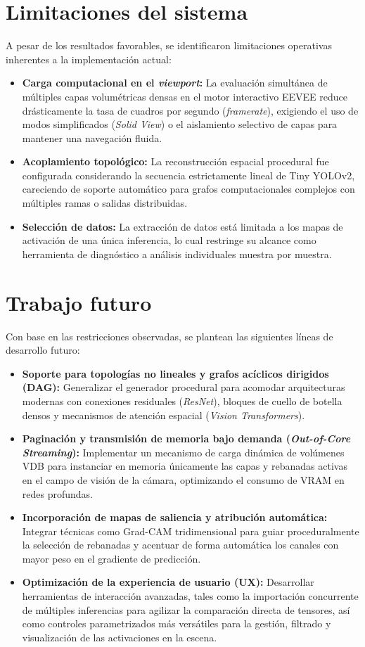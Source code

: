 \section{Limitaciones del sistema}
A pesar de los resultados favorables, se identificaron limitaciones operativas inherentes a la implementación actual:
\begin{itemize}
    \item \textbf{Carga computacional en el \textit{viewport}:} La evaluación simultánea de múltiples capas volumétricas densas en el motor 
    interactivo EEVEE reduce drásticamente la tasa de cuadros por segundo (\textit{framerate}), exigiendo el uso de modos simplificados 
    (\textit{Solid View}) o el aislamiento selectivo de capas para mantener una navegación fluida.
    \item \textbf{Acoplamiento topológico:} La reconstrucción espacial procedural fue configurada considerando la secuencia estrictamente 
    lineal de Tiny YOLOv2, careciendo de soporte automático para grafos computacionales complejos con múltiples ramas o salidas distribuidas.
    \item \textbf{Selección de datos:} La extracción de datos está limitada a los mapas de activación de una única inferencia, lo cual 
    restringe su alcance como herramienta de diagnóstico a análisis individuales muestra por muestra.
\end{itemize}

\section{Trabajo futuro}
Con base en las restricciones observadas, se plantean las siguientes líneas de desarrollo futuro:
\begin{itemize}
    \item \textbf{Soporte para topologías no lineales y grafos acíclicos dirigidos (DAG):} Generalizar el generador procedural para acomodar 
    arquitecturas modernas con conexiones residuales (\textit{ResNet}), bloques de cuello de botella densos y mecanismos de atención espacial 
    (\textit{Vision Transformers}).
    \item \textbf{Paginación y transmisión de memoria bajo demanda (\textit{Out-of-Core Streaming}):} Implementar un mecanismo de carga dinámica 
    de volúmenes VDB para instanciar en memoria únicamente las capas y rebanadas activas en el campo de visión de la cámara, optimizando el 
    consumo de VRAM en redes profundas.
    \item \textbf{Incorporación de mapas de saliencia y atribución automática:} Integrar técnicas como Grad-CAM tridimensional para guiar 
    proceduralmente la selección de rebanadas y acentuar de forma automática los canales con mayor peso en el gradiente de predicción.
    \item \textbf{Optimización de la experiencia de usuario (UX):} Desarrollar herramientas de interacción avanzadas, tales como la 
    importación concurrente de múltiples inferencias para agilizar la comparación directa de tensores, así como controles parametrizados 
    más versátiles para la gestión, filtrado y visualización de las activaciones en la escena.
\end{itemize}